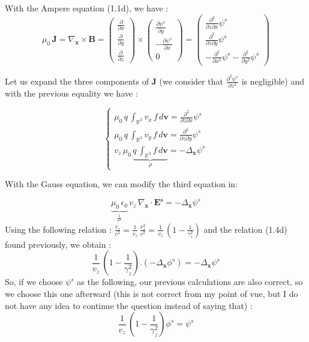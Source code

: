 \documentclass[10pt]{article}
\newcommand{\D}{{\partial}}
\begin{document}
With the Ampere equation (1.1d), we have : \\
$$\mu_{0}\,\mathbf{J} = \nabla_{\mathbf{x}} \times \mathbf{B} = \left( \begin{array}{c}
\frac{\D}{\D x} \\
\frac{\D}{\D y} \\
\frac{\D}{\D z}
\end{array} \right) \times \left(
\begin{array}{c}
\frac{\D \psi^{s}}{\D y} \\
- \frac{\D \psi^{s}}{\D x}\\
0
\end{array} \right) = \left( \begin{array}{c}
\frac{\D^2}{\D z \D x}\psi^{s} \\
\frac{\D^2}{\D z \D y}\psi^{s} \\
- \frac{\D^2}{\D x^2}\psi^{s} - \frac{\D^2}{\D y^2}\psi^{s}
\end{array} \right)$$

Let us expand the three components of \textbf{J} (we consider that $\frac{\D^2 \psi^s}{\D z^2}$ is negligible) and with the previous equality we have :


\begin{displaymath}
  \left\lbrace
     \begin{array}{ll}
\mu_{0}\,q\,\int_{\mathbb{R}^3} v_x\,f\,d\mathbf{v} = \frac{\D^2}{\D z \D x}\psi^{s} \\
\mu_{0}\,q\,\int_{\mathbb{R}^3} v_y\,f\,d\mathbf{v} = \frac{\D^2}{\D z \D y}\psi^{s} \\
v_z\,\mu_{0}\,\underbrace{q\,\int_{\mathbb{R}^3} f\,d\mathbf{v}}_{\rho} = - \Delta_{\mathbf{x}} \psi^{s}
    \end{array}
  \right.
\end{displaymath} 

With the Gauss equation, we can modify the third equation in:

$$\underbrace{\mu_{0}\,\epsilon_{0}}_{\frac{1}{c^2}}\,v_z\,\nabla_{\mathbf{x}} \cdot \mathbf{E^s} = - \Delta_{\mathbf{x}} \psi^{s}$$
Using the following relation : $\frac{v_z}{c^2} = \frac{1}{v_z}\,\frac{v_z^2}{c^2} = \frac{1}{v_z}\,\left(1 - \frac{1}{\gamma_{z}^{2}}\right)$ and the relation (1.4d) found previously, we obtain : \\
$$\frac{1}{v_z}\,\left(1 - \frac{1}{\gamma_{z}^{2}}\right).\left(- \Delta_{\mathbf{x}} \phi^{s}\right) = - \Delta_{\mathbf{x}} \psi^{s}$$
So, if we choose $\psi^{s}$ as the following, our previous calculations are also correct, so we choose this one afterward (this is not correct from my point of vue, but I do not have any idea to continue the question instead of saying that) :
$$\frac{1}{v_z}\,\left(1 - \frac{1}{\gamma_{z}^{2}}\right) \phi^{s} = \psi^{s}$$
\end{document}
